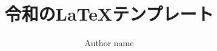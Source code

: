 \documentclass[a4paper,11pt]{ltjreport}
\begin{document}
\title{令和の\LaTeX テンプレート}
\author{Author name}
\date{\the\year}
\maketitle
\tableofcontents


\end{document}
